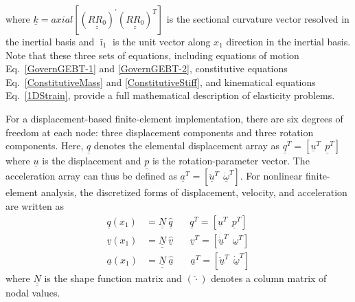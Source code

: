 \documentclass{aiaa-tc}
\newcommand{\tens}[1]{\underline{\underline{#1}}}
\renewcommand{\vec}[1]{\underline{#1}}
\begin{document}
where $\vec{k} = axial [(\tens{R R_0})^\prime (\tens{R R_0})^T]$ is the sectional
curvature vector resolved in the inertial basis and $\bar{\imath}_1$ is the unit
vector along $x_1$ direction in the inertial basis. Note that these
three sets of equations, including equations of motion
Eq.~\eqref{GovernGEBT-1} and \eqref{GovernGEBT-2}, constitutive equations
Eq.~\eqref{ConstitutiveMass} and \eqref{ConstitutiveStiff}, and kinematical
equations Eq.~\eqref{1DStrain}, provide a full mathematical description of elasticity problems. 

For a displacement-based finite-element implementation, there are six
degrees of freedom at each node: three displacement components and three
rotation components. Here, $\vec{q}$ denotes the elemental
displacement array as $\underline{q}^T=\left[
\underline{u}^T~~\underline{p}^T\right]$ where $\vec{u}$ is the
displacement and $\vec{p}$ is the rotation-parameter vector. The
acceleration array can thus be defined as $\underline{a}^T=\left[
\ddot{\underline{u}}^T~~ \dot{\underline{\omega}}^T \right]$. For nonlinear
finite-element analysis, the discretized forms of
displacement, velocity, and acceleration are written as
\begin{align}
	\label{DiscretizedDisp}
	\underline{q} (x_1) &= \underline{\underline{N}} ~\hat{\underline{q}}~~~~~~~~\underline{q}^T = \left[ \underline{u}^T~~\underline{p}^T \right] \\
	\label{DiscretizedVel}
	\underline{v}(x_1) &= \underline{\underline{N}}~\hat{\underline{v}}~~~~~~~~\underline{v}^T = \left[\underline{\dot{u}}^T~~\underline{\omega}^T \right] \\
	\label{DiscretizedAcc}
	\underline{a}(x_1) &= \underline{\underline{N}}~ \hat{\underline{a}}~~~~~~~~\underline{a}^T = \left[ \ddot{\underline{u}}^T~~\dot{\underline{\omega}}^T \right]	
\end{align}
where $\tens{N}$ is the shape function matrix and $(\hat{\cdot})$ denotes a
column matrix of nodal values.
\end{document}
